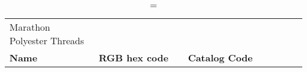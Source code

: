 
\begin{longtable}{p{0.3\linewidth} p{0.3\linewidth} p{0.4\linewidth}}
\caption = {Marathon Polyester Threads}
\label{tblr:marathonpoly}\\
\textbf{Name} & \textbf{RGB hex code} & \textbf{Catalog Code} \\

\end{longtable}

